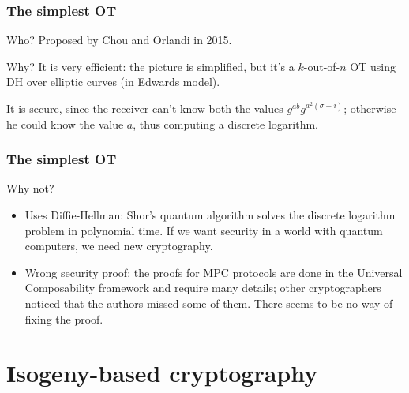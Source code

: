 \documentclass{beamer}
\begin{document}
    \begin{frame}
        \frametitle{The simplest OT}
        
        \begin{block}{Who?}
            Proposed by Chou and Orlandi in 2015.
        \end{block}
    
        \begin{block}{Why?}
            It is very efficient: the picture is simplified, but it's a $k$-out-of-$n$ OT using DH over elliptic curves (in Edwards model).
            
            It is secure, since the receiver can't know both the values $g^{ab}g^{a^2(\sigma-i)}$; otherwise he could know the value $a$, thus computing a discrete logarithm.
        \end{block}
    \end{frame}


    \begin{frame}
        \frametitle{The simplest OT}
        
        \begin{block}{Why not?}
            \begin{itemize}[<+->]
                \item Uses Diffie-Hellman: Shor's quantum algorithm solves the discrete logarithm problem in polynomial time. If we want security in a world with quantum computers, we need new cryptography.
                \item Wrong security proof: the proofs for MPC protocols are done in the Universal Composability framework and require many details; other cryptographers noticed that the authors missed some of them. There seems to be no way of fixing the proof.
            \end{itemize}
        \end{block}
    \end{frame}


    \section{Isogeny-based cryptography}
    
\end{document}
